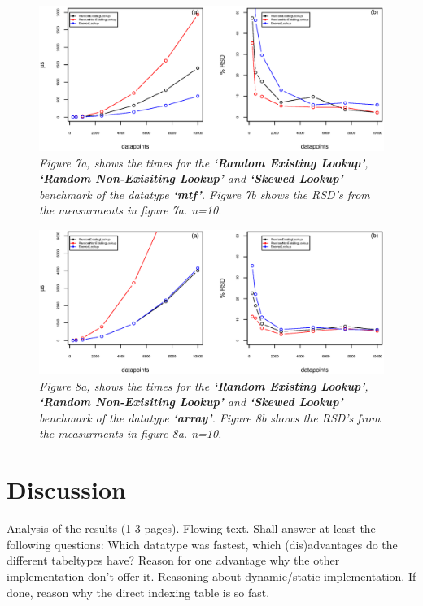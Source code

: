 \documentclass[a4paper,11pt,twoside]{article}
\begin{document}
\begin{figure}[H] 
\centering 
\includegraphics[width=\textwidth]{figures/fig7.eps}
\caption{\textit{Figure 7a, shows the times for the \textbf{`Random Existing
    Lookup'}, \textbf{`Random Non-Exisiting Lookup'} and
  \textbf{`Skewed Lookup'} benchmark of the datatype \textbf{`mtf'}. Figure 7b shows the RSD's from the measurments
in figure 7a. n=10.}}
\end{figure}

\begin{figure}[H] 
\centering 
\includegraphics[width=\textwidth]{figures/fig8.eps}
\caption{\textit{Figure 8a, shows the times for the \textbf{`Random Existing
    Lookup'}, \textbf{`Random Non-Exisiting Lookup'} and
  \textbf{`Skewed Lookup'} benchmark of the datatype \textbf{`array'}. Figure 8b shows the RSD's from the measurments
in figure 8a. n=10.}}
\end{figure}


\section{Discussion}
Analysis of the results (1-3 pages). Flowing text. Shall answer at
least the following questions:
Which datatype was fastest, which (dis)advantages do the different
tabeltypes have? Reason for one advantage why the other implementation
don't offer it. Reasoning about dynamic/static implementation. If
done, reason why the direct indexing table is so fast.


\end{document}
